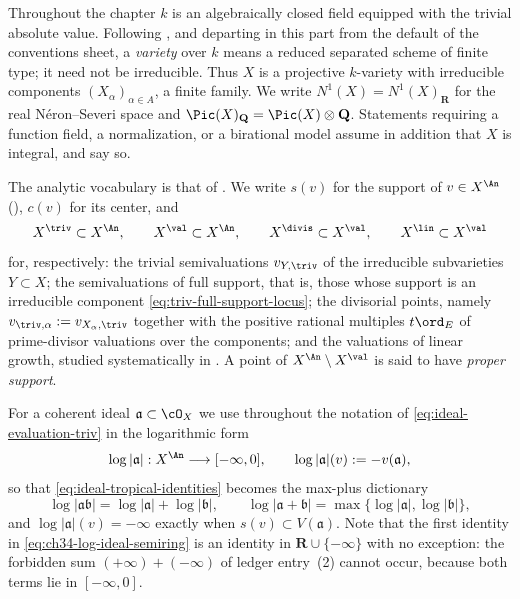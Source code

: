 Throughout the chapter $k$ is an algebraically closed field equipped with
the trivial absolute value.  Following \cite[\S1]{BJ22}, and departing in
this part from the default of the conventions sheet, a \emph{variety} over
$k$ means a reduced separated scheme of finite type; it need not be
irreducible.  Thus $X$ is a projective $k$-variety with irreducible
components $(X_\alpha)_{\alpha\in A}$, a finite family.  We write
$N^1(X)=N^1(X)_{\mathbf R}$ for the real N\'eron--Severi space and
$\Pic(X)_{\mathbf Q}=\Pic(X)\otimes\mathbf Q$.  Statements requiring a
function field, a normalization, or a birational model assume in addition
that $X$ is integral, and say so.

The analytic vocabulary is that of .  We
write $s(v)$ for the support of $v\in X^{\An}$
(), $c(v)$ for its center, and
\begin{equation}
\label{eq:ch34-loci}
 X^{\triv}\subset X^{\An},\qquad
 X^{\val}\subset X^{\An},\qquad
 X^{\divis}\subset X^{\val},\qquad
 X^{\lin}\subset X^{\val}
\end{equation}
for, respectively: the trivial semivaluations $v_{Y,\triv}$ of the
irreducible subvarieties $Y\subset X$; the semivaluations of full support,
that is, those whose support is an irreducible component
\eqref{eq:triv-full-support-locus}; the divisorial points, namely
$v_{\triv,\alpha}:=v_{X_\alpha,\triv}$ together with the positive rational
multiples $t\ord_E$ of prime-divisor valuations over the components; and
the valuations of linear growth, studied systematically in
.  A point of
$X^{\An}\setminus X^{\val}$ is said to have \emph{proper support}.

For a coherent ideal $\mathfrak a\subset\cO_X$ we use throughout the
notation of \eqref{eq:ideal-evaluation-triv} in the logarithmic form
\begin{equation}
\label{eq:ch34-log-ideal}
 \log|\mathfrak a|:X^{\An}\longrightarrow[-\infty,0],
 \qquad
 \log|\mathfrak a|(v):=-v(\mathfrak a),
\end{equation}
so that \eqref{eq:ideal-tropical-identities} becomes the max-plus dictionary
\begin{equation}
\label{eq:ch34-log-ideal-semiring}
 \log|\mathfrak a\mathfrak b|=\log|\mathfrak a|+\log|\mathfrak b|,
 \qquad
 \log|\mathfrak a+\mathfrak b|
 =\max\{\log|\mathfrak a|,\log|\mathfrak b|\},
\end{equation}
and $\log|\mathfrak a|(v)=-\infty$ exactly when
$s(v)\subset V(\mathfrak a)$.  Note that the first identity in
\eqref{eq:ch34-log-ideal-semiring} is an identity in
$\mathbf R\cup\{-\infty\}$ with no exception: the forbidden sum
$(+\infty)+(-\infty)$ of ledger entry~(2) cannot occur, because both terms
lie in $[-\infty,0]$.

